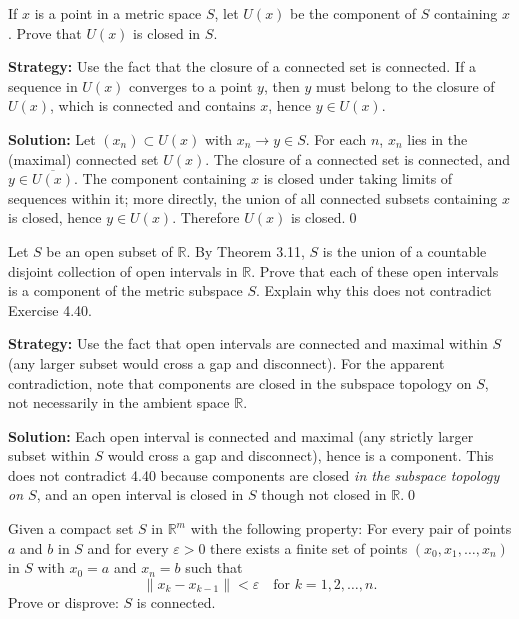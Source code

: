 \begin{problembox}
If $x$ is a point in a metric space $S$, let $U(x)$ be the component of $S$ containing $x$. Prove that $U(x)$ is closed in $S$.
\end{problembox}

\noindent\textbf{Strategy:} Use the fact that the closure of a connected set is connected. If a sequence in $U(x)$ converges to a point $y$, then $y$ must belong to the closure of $U(x)$, which is connected and contains $x$, hence $y \in U(x)$.

\bigskip\noindent\textbf{Solution:}
Let $(x_n)\subset U(x)$ with $x_n\to y\in S$. For each $n$, $x_n$ lies in the (maximal) connected set $U(x)$. The closure of a connected set is connected, and $y\in\overline{U(x)}$. The component containing $x$ is closed under taking limits of sequences within it; more directly, the union of all connected subsets containing $x$ is closed, hence $y\in U(x)$. Therefore $U(x)$ is closed.\qed



\begin{problembox}
Let $S$ be an open subset of $\mathbb{R}$. By Theorem 3.11, $S$ is the union of a countable disjoint collection of open intervals in $\mathbb{R}$. Prove that each of these open intervals is a component of the metric subspace $S$. Explain why this does not contradict Exercise 4.40.
\end{problembox}

\noindent\textbf{Strategy:} Use the fact that open intervals are connected and maximal within $S$ (any larger subset would cross a gap and disconnect). For the apparent contradiction, note that components are closed in the subspace topology on $S$, not necessarily in the ambient space $\mathbb{R}$.

\bigskip\noindent\textbf{Solution:}
Each open interval is connected and maximal (any strictly larger subset within $S$ would cross a gap and disconnect), hence is a component. This does not contradict 4.40 because components are closed \emph{in the subspace topology on $S$}, and an open interval is closed in $S$ though not closed in $\mathbb{R}$.\qed



\begin{problembox}
Given a compact set $S$ in $\mathbb{R}^m$ with the following property: For every pair of points $a$ and $b$ in $S$ and for every $\varepsilon > 0$ there exists a finite set of points $(x_0, x_1, \ldots, x_n)$ in $S$ with $x_0 = a$ and $x_n = b$ such that
\[\|x_k - x_{k-1}\| < \varepsilon \quad \text{for } k = 1, 2, \ldots, n.\]
Prove or disprove: $S$ is connected.
\end{problembox}

